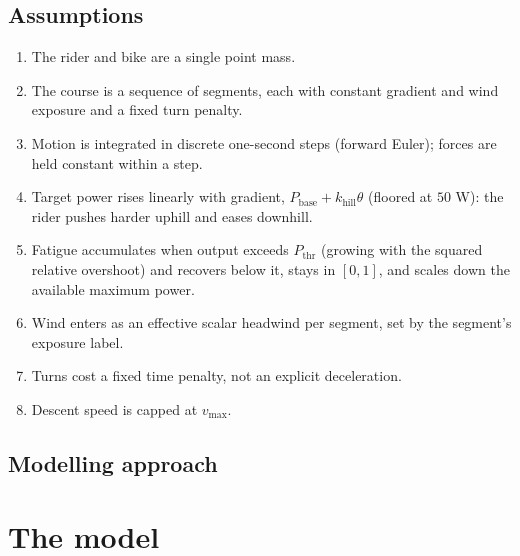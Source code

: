 \documentclass[11pt]{article}
\begin{document}
\subsection{Assumptions}
\begin{enumerate}
  \item The rider and bike are a single point mass.
  \item The course is a sequence of segments, each with constant gradient and wind exposure and a fixed turn penalty.
  \item Motion is integrated in discrete one-second steps (forward Euler); forces are held constant within a step.
  \item Target power rises linearly with gradient, $P_\mathrm{base} + k_\mathrm{hill}\theta$ (floored at $50$ W): the rider pushes harder uphill and eases downhill.
  \item Fatigue accumulates when output exceeds $P_\mathrm{thr}$ (growing with the squared relative overshoot) and recovers below it, stays in $[0,1]$, and scales down the available maximum power.
  \item Wind enters as an effective scalar headwind per segment, set by the segment's exposure label.
  \item Turns cost a fixed time penalty, not an explicit deceleration.
  \item Descent speed is capped at $v_\mathrm{max}$.
\end{enumerate}

\subsection{Modelling approach}

\section{The model}
\end{document}
